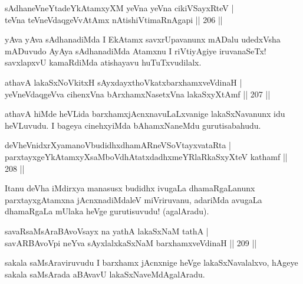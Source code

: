 
\begin{shl}
sAdhaneVneYtadeYkAtamxyXM yeVna yeVna cikiVSayxRteV |\\
teVna teVneVdaqgeVvA\s \s tAmx nAtishiVtimaRnAgapi \hfill || 206 ||
\end{shl}

\begin{artha}
yAva yAva sAdhanadiMda I EkAtamx savxrUpavanunx mADalu udedxVsha mADuvudo AyAya sAdhanadiMda Atamxnu I riVtiyAgiye iruvanaSeTx! savxlapxvU kamaRdiMda atishayavu huTuTxvudilalx.
\end{artha}

\begin{shl}
athavA lakaSxNoVkitxH sAyxdayxthoVkatxbarxhamxveVdinaH |\\
yeVneVdaqgeVva cihenxVna bArxhamxNasetxVna lakaSxyXtAmf \hfill || 207 ||
\end{shl}

\begin{artha}%
athavA hiMde heVLida barxhamxjAcnxnavuLaLxvanige lakaSxNavanunx idu heVLuvudu. I bageya cinehxyiMda bAhamxNaneMdu gurutisabahudu.
\end{artha}

\begin{shl}
deVheVnidxrXyamanoVbudidhxdhamARneVSoV\s tayxvataRta |\\
parxtayxgeYkAtamxyXsaMboVdhAtatxdadhxmeYRlaRkaSxyXteV kathamf \hfill || 208 ||
\end{shl}

\begin{artha}
Itanu deVha iMdirxya manasusx budidhx ivugaLa dhamaRgaLanunx parxtayxgAtamxna jAcnxnadiMdaleV miVriruvanu, adariMda avugaLa dhamaRgaLa mUlaka heVge gurutisuvudu! (agalAradu).
\end{artha}

\begin{shl}
savaRsaMsAraBAvoV\s sayx na yathA lakaSxNaM tathA |\\
savARBAvoV\s pi neYva sAyxlalxkaSxNaM barxhamxveVdinaH \hfill || 209 ||
\end{shl}

\begin{artha}
sakala saMsAraviruvudu I barxhamx jAcnxnige heVge lakaSxNavalalxvo, hAgeye sakala saMsArada aBAvavU lakaSxNaveMdAgalAradu.
\end{artha}


